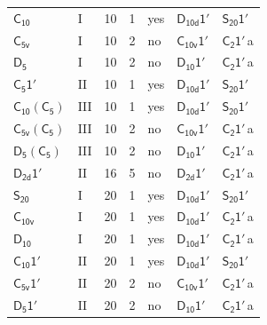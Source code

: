 \documentclass[10pt,a4paper]{article}
\numberwithin{equation}{section}
\newcommand{\grp}[1]{\mathsf{#1}}
\newcommand{\clsletter}[1]{\,{\scriptsize\color{black!55}#1}}
\begin{document}
{\begin{longtable}{@{}llrrlll@{}}
\href{../../../rotation/data/pdf/C10.pdf}{$\grp{C_{10}}$} & I & 10 & 1 & yes & \href{D10d-1p.pdf}{$\grp{D_{10d}1'}$} & \href{S20-1p.pdf}{$\grp{S_{20}1'}$}\\
\href{../../../rotation/data/pdf/C5v.pdf}{$\grp{C_{5v}}$} & I & 10 & 2 & no & \href{C10v-1p.pdf}{$\grp{C_{10v}1'}$} & \href{C2-1p.pdf}{$\grp{C_{2}1'}$}\clsletter{a}\\
\href{../../../rotation/data/pdf/D5.pdf}{$\grp{D_{5}}$} & I & 10 & 2 & no & \href{D10-1p.pdf}{$\grp{D_{10}1'}$} & \href{C2-1p.pdf}{$\grp{C_{2}1'}$}\clsletter{a}\\
\href{C5-1p.pdf}{$\grp{C_{5}1'}$} & II & 10 & 1 & yes & \href{D10d-1p.pdf}{$\grp{D_{10d}1'}$} & \href{S20-1p.pdf}{$\grp{S_{20}1'}$}\\
\href{C10-C5.pdf}{$\grp{C_{10}}(\grp{C_{5}})$} & III & 10 & 1 & yes & \href{D10d-1p.pdf}{$\grp{D_{10d}1'}$} & \href{S20-1p.pdf}{$\grp{S_{20}1'}$}\\
\href{C5v-C5.pdf}{$\grp{C_{5v}}(\grp{C_{5}})$} & III & 10 & 2 & no & \href{C10v-1p.pdf}{$\grp{C_{10v}1'}$} & \href{C2-1p.pdf}{$\grp{C_{2}1'}$}\clsletter{a}\\
\href{D5-C5.pdf}{$\grp{D_{5}}(\grp{C_{5}})$} & III & 10 & 2 & no & \href{D10-1p.pdf}{$\grp{D_{10}1'}$} & \href{C2-1p.pdf}{$\grp{C_{2}1'}$}\clsletter{a}\\
\href{D2d-1p.pdf}{$\grp{D_{2d}1'}$} & II & 16 & 5 & no & \href{D2d-1p.pdf}{$\grp{D_{2d}1'}$} & \href{C2-1p.pdf}{$\grp{C_{2}1'}$}\clsletter{a}\\
\href{../../../rotation/data/pdf/S20.pdf}{$\grp{S_{20}}$} & I & 20 & 1 & yes & \href{D10d-1p.pdf}{$\grp{D_{10d}1'}$} & \href{S20-1p.pdf}{$\grp{S_{20}1'}$}\\
\href{../../../rotation/data/pdf/C10v.pdf}{$\grp{C_{10v}}$} & I & 20 & 1 & yes & \href{D10d-1p.pdf}{$\grp{D_{10d}1'}$} & \href{C2-1p.pdf}{$\grp{C_{2}1'}$}\clsletter{a}\\
\href{../../../rotation/data/pdf/D10.pdf}{$\grp{D_{10}}$} & I & 20 & 1 & yes & \href{D10d-1p.pdf}{$\grp{D_{10d}1'}$} & \href{C2-1p.pdf}{$\grp{C_{2}1'}$}\clsletter{a}\\
\href{C10-1p.pdf}{$\grp{C_{10}1'}$} & II & 20 & 1 & yes & \href{D10d-1p.pdf}{$\grp{D_{10d}1'}$} & \href{S20-1p.pdf}{$\grp{S_{20}1'}$}\\
\href{C5v-1p.pdf}{$\grp{C_{5v}1'}$} & II & 20 & 2 & no & \href{C10v-1p.pdf}{$\grp{C_{10v}1'}$} & \href{C2-1p.pdf}{$\grp{C_{2}1'}$}\clsletter{a}\\
\href{D5-1p.pdf}{$\grp{D_{5}1'}$} & II & 20 & 2 & no & \href{D10-1p.pdf}{$\grp{D_{10}1'}$} & \href{C2-1p.pdf}{$\grp{C_{2}1'}$}\clsletter{a}\\

\end{longtable}}
\end{document}
